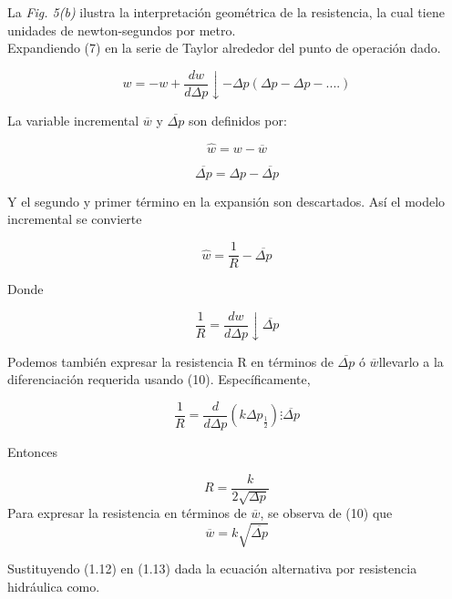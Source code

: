 \documentclass[a4paper,12pt,twoside]{proyectotanquesecci}
\begin{document}
La \textit{Fig. 5(b)} ilustra la interpretación geométrica de la resistencia, la cual tiene unidades de newton-segundos por metro.\\

Expandiendo (7) en la serie de Taylor alrededor del punto de operación dado.

\begin{equation}
w=-w+\frac{dw}{d\Delta p}\downarrow -\Delta p (\Delta p -\Delta p - ....)
\end{equation}

La variable incremental $\overline{w}$  y $\overline{\Delta p}$ son definidos por:

\begin{equation}
\widehat{w}=w-\overline{w}
\end{equation}

\begin{equation}
\overline{\Delta p}=\Delta p - \overline{\Delta p} 
\end{equation}

Y el segundo y primer término en la expansión son descartados. Así el modelo incremental se convierte

\begin{equation}
\widehat{w}=\frac{1}{R}-\overline{\Delta p}
\end{equation}

Donde

\begin{equation}
\frac{1}{R}=\frac{dw}{d\Delta p}\downarrow\overline{\Delta p}
\end{equation}

Podemos también expresar la resistencia R en términos de $\overline{\Delta p}$ ó $\overline{w}$llevarlo a la diferenciación requerida usando (10). Específicamente,

\begin{equation}
\frac{1}{R}=\frac{d}{d\Delta p}(k\Delta p_{\frac{1}{2}})\vdots \overline{\Delta p}
\end{equation}

Entonces

\begin{equation}
R=\frac{k}{2\sqrt{\Delta p}}
\end{equation} 
Para expresar la resistencia en términos de $\overline{w}$, se observa de (10) que 
\begin{equation}
\overline{w}=k\sqrt{\overline{\Delta p}}
\end{equation}

Sustituyendo (1.12) en (1.13) dada la ecuación alternativa por resistencia hidráulica como.
\end{document}
